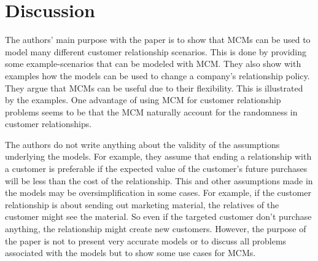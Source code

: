 \documentclass[11pt]{article}
\begin{document}
\section{Discussion}


The authors' main purpose with the paper is to show that MCMs can be used to model many different customer relationship scenarios. 
This is done by providing some example-scenarios that can be modeled with MCM. They also show with examples how the models can be used to change a company's relationship policy. They argue that MCMs can be useful due to their flexibility. This is illustrated by the examples. 
One advantage of using MCM for customer relationship problems seems to be that the MCM naturally account for the randomness  in customer relationships. 

The authors do not write anything about the validity of the assumptions underlying the models. For example, they assume that ending a relationship with a customer is preferable if the expected value of the customer's future purchases will be less than the cost of the relationship. This and other assumptions made in the models may be oversimplification in some cases. 
For example, if the customer relationship is about sending out marketing material, the relatives of the customer might see the material.
So even if the targeted customer don't purchase anything, the relationship might create new customers. However, the purpose of the paper is not to present very accurate models or to discuss all problems associated with the models but to show some use cases for MCMs.

\end{document}
